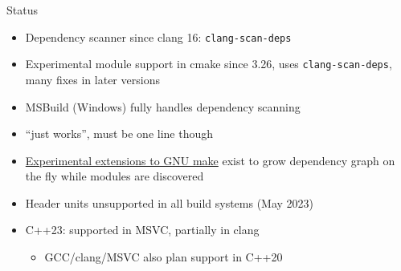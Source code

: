 \begin{frame}[fragile]
    \begin{block}{Status}
      \begin{itemize}
        \item Dependency scanner since clang 16: \texttt{clang-scan-deps}
        \item Experimental module support in cmake since 3.26, uses \texttt{clang-scan-deps}, many fixes in later versions %
        \item MSBuild (Windows) fully handles dependency scanning
        \item {} ``just works'', must be one line though
        \item \href{https://wg21.link/p1602}{Experimental extensions to GNU make} exist to grow dependency graph on the fly while modules are discovered
        \item Header units unsupported in all build systems (May 2023) %
        \item C++23:  supported in MSVC, partially in clang
        \begin{itemize}
          \item GCC/clang/MSVC also plan support in C++20 %
        \end{itemize}
      \end{itemize}
    \end{block}
\end{frame}

